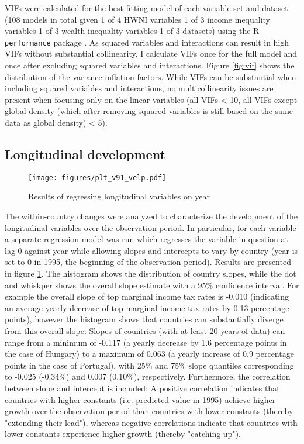 \documentclass[11pt]{article}
\begin{document}
VIFs were calculated for the best-fitting model of each variable set and dataset (108 models in total given 1 of 4 HWNI variables \texttimes{} 1 of 3 income inequality variables \texttimes{} 1 of 3 wealth inequality variables \texttimes{} 1 of 3 datasets) using the R \texttt{performance} package \parencite{Luedecke_etal_2021_performance}. 
As squared variables and interactions can result in high VIFs without substantial collinearity, I calculate VIFs once for the full model and once after excluding squared variables and interactions.
Figure \ref{fig:vif} shows the distribution of the variance inflation factors.
While VIFs can be substantial when including squared variables and interactions, no multicollinearity issues are present when focusing only on the linear variables (all VIFs < 10, all VIFs except global density (which after removing squared variables is still based on the same data as global density) < 5).



\subsection{Longitudinal development}
\label{app_velp}
\begin{landscape}

\begin{figure}[htbp]
\centering
\texttt{[image: figures/plt\_v91\_velp.pdf]}
\caption{\label{fig:velp}Results of regressing longitudinal variables on year}
\end{figure}

\end{landscape}

The within-country changes were analyzed to characterize the development of the longitudinal variables over the observation period.
In particular, for each variable a separate regression model was run which regresses the variable in question at lag 0 against year while allowing slopes and intercepts to vary by country (year is set to 0 in 1995, the beginning of the observation period).
Results are presented in figure \ref{fig:velp}.
The histogram shows the distribution of country slopes, while the dot and whiskper shows the overall slope estimate with a 95\% confidence interval.
For example the overall slope of top marginal income tax rates is -0.010 (indicating an average yearly decrease of top marginal income tax rates by 0.13 percentage points), however the histogram shows that countries can substantially diverge from this overall slope: 
Slopes of countries (with at least 20 years of data) can range from a minimum of -0.117 (a yearly decrease by 1.6 percentage points in the case of Hungary) to a maximum of 0.063 (a yearly increase of 0.9 percentage points in the case of Portugal), with 25\% and 75\% slope quantiles corresponding to -0.025 (-0.34\%) and 0.007 (0.10\%), respectively.
Furthermore, the correlation between slope and intercept is included:
A positive correlation indicates that countries with higher constants (i.e. predicted value in 1995) achieve higher growth over the observation period than countries with lower constants (thereby "extending their lead"), whereas negative correlations indicate that countries with lower constants experience higher growth (thereby "catching up").
\end{document}
